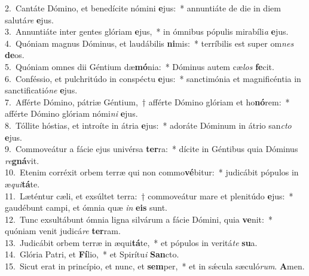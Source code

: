 {2.~}Cantáte Dómino, et benedícite nómini \textbf{e}jus:~* annuntiáte de die in diem salutá\textit{re} \textbf{e}jus.\\
{3.~}Annuntiáte inter gentes glóriam \textbf{e}jus,~* in ómnibus pópulis mirabíli\textit{a} \textbf{e}jus.\\
{4.~}Quóniam magnus Dóminus, et laudábilis \textbf{ni}mis:~* terríbilis est super om\textit{nes} \textbf{de}os.\\
{5.~}Quóniam omnes dii Géntium dæ\textbf{mó}nia:~* Dóminus autem cæ\textit{los} \textbf{fe}cit.\\
{6.~}Conféssio, et pulchritúdo in conspéctu \textbf{e}jus:~* sanctimónia et magnificéntia in sanctificatió\textit{ne} \textbf{e}jus.\\
{7.~}Afférte Dómino, pátriæ Géntium,~† afférte Dómino glóriam et ho\textbf{nó}rem:~* afférte Dómino glóriam nómi\textit{ni} \textbf{e}jus.\\
{8.~}Tóllite hóstias, et introíte in átria \textbf{e}jus:~* adoráte Dóminum in átrio san\textit{cto} \textbf{e}jus.\\
{9.~}Commoveátur a fácie ejus univérsa \textbf{ter}ra:~* dícite in Géntibus quia Dóminus \textit{re}\textbf{gná}vit.\\
{10.~}Etenim corréxit orbem terræ qui non commo\textbf{vé}bitur:~* judicábit pópulos in æ\textit{qui}\textbf{tá}te.\\
{11.~}Læténtur cæli, et exsúltet terra:~† commoveátur mare et plenitúdo \textbf{e}jus:~* gaudébunt campi, et ómnia quæ \textit{in} \textbf{e}\textbf{is} sunt.\\
{12.~}Tunc exsultábunt ómnia ligna silvárum a fácie Dómini, quia \textbf{ve}nit:~* quóniam venit judicá\textit{re} \textbf{ter}ram.\\
{13.~}Judicábit orbem terræ in æqui\textbf{tá}te,~* et pópulos in veritá\textit{te} \textbf{su}a.\\
{14.~}Glória Patri, et \textbf{Fí}lio,~* et Spirítu\textit{i} \textbf{San}cto.\\
{15.~}Sicut erat in princípio, et nunc, et \textbf{sem}per,~* et in sǽcula sæculó\textit{rum}. \textbf{A}men.\\
